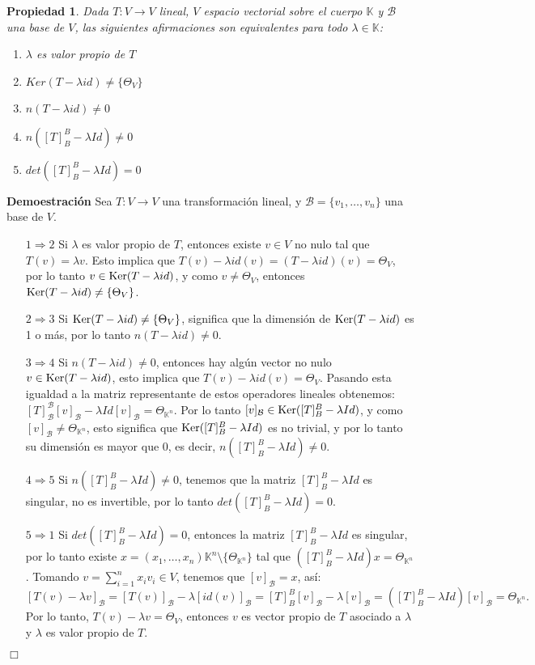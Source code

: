 \documentclass[12pt]{book}
\newtheorem{prop}{Propiedad}
\def\K{\mathbb{K}}
\def\B{\mathcal{B}}
\def\Ker{\textup{Ker}}
\begin{document}
\begin{prop}
Dada $T:V\rightarrow V$ lineal, $V$ espacio vectorial sobre el cuerpo $\K$ y $\B$ una base de $V$, las siguientes afirmaciones son equivalentes para todo $\lambda \in\K$:
\begin{enumerate}
\item $\lambda$ es valor propio de $T$
\item $Ker(T-\lambda id)\not= \{\Theta_V\}$
\item $n(T-\lambda id)\not =0$
\item $n([T]_B^B-\lambda Id)\not=0$
\item $det([T]_B^B-\lambda Id)=0$
\end{enumerate}
\end{prop}

{\bf Demoestración} Sea $T:V\rightarrow V$ una transformaci\'on lineal, y $\B=\{v_1,\dots,v_n\}$ una base de $V$.
\begin{itemize}
\item[$1\Rightarrow 2$] Si $\lambda$ es valor propio de $T$, entonces existe $v\in V$ no nulo tal que $T(v)=\lambda v$.
Esto implica que $T(v)-\lambda id(v)=(T-\lambda id)(v)=\Theta_V$, por lo tanto $v\in\Ker(T-\lambda id)$, y como $v\not= \Theta_V$, entonces $\Ker(T-\lambda id)\not=\{\Theta_V\}$.
\item[$2\Rightarrow 3$] Si $\Ker(T-\lambda id)\not=\{\Theta_V\}$, significa que la dimensión de $\Ker(T-\lambda id)$ es 1 o más, por lo tanto $n(T-\lambda id)\not =0$.
\item[$3\Rightarrow 4$] Si $n(T-\lambda id)\not =0$, entonces hay algún vector no nulo $v\in \Ker(T-\lambda id)$, esto implica que $T(v)-\lambda id(v)=\Theta_V$. 
Pasando esta igualdad a la matriz representante de estos operadores lineales obtenemos: $[T]_\B^\B[v]_\B-\lambda Id[v]_\B=\Theta_{\K^n}$.
Por lo tanto $[v]_\B\in \Ker([T]_B^B-\lambda Id)$, y como $[v]_\B\not=\Theta_{\K^n}$, esto significa que $\Ker([T]_B^B-\lambda Id)$ es no trivial, y por lo tanto su dimensión es mayor que 0, es decir, $n([T]_B^B-\lambda Id)\not=0$.
\item[$4\Rightarrow 5$] Si $n([T]_B^B-\lambda Id)\not=0$, tenemos que la matriz $[T]_B^B-\lambda Id$ es singular, no es invertible, por lo tanto $det([T]_B^B-\lambda Id)=0$.
\item[$5\Rightarrow 1$] Si $det([T]_B^B-\lambda Id)=0$, entonces la matriz $[T]_B^B-\lambda Id$ es singular, por lo tanto existe $x=(x_1,\dots,x_n)\K^n\setminus\{\Theta_{\K^n}\}$ tal que $([T]_B^B-\lambda Id)x=\Theta_{\K^n}$.
Tomando $v=\sum_{i=1}^n x_iv_i \in V$, tenemos que $[v]_\B=x$, así: 
$$[T(v)-\lambda v]_\B=[T(v)]_\B-\lambda [id(v)]_\B=[T]_B^B[v]_\B-\lambda [v]_\B=([T]_B^B-\lambda Id)[v]_\B =\Theta_{\K^n}.$$
Por lo tanto, $T(v)-\lambda v=\Theta_V$, entonces $v$ es vector propio de $T$ asociado a $\lambda$ y $\lambda$ es valor propio de $T$.
\end{itemize}
 \hfill $\Box$
\end{document}
